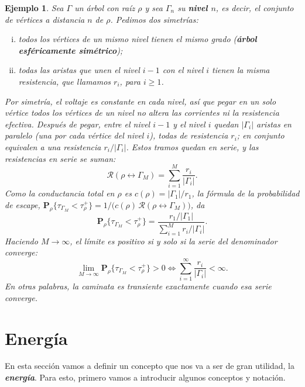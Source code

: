 \documentclass[11pt,a4paper]{article}
\newcommand{\Prob}{\textbf{P}}
\newcommand{\defn}[1]{\textbf{\emph{#1}}}
\numberwithin{equation}{section}
\theoremstyle{LPplain}
\theoremstyle{LPdef}
\theoremstyle{LPrem}
\newtheorem{ejemplo}[teo]{Ejemplo}
\begin{document}
\begin{ejemplo}\label{ej:arbol-simetrico}
  Sea $\Gamma$ un árbol con raíz $\rho$ y sea $\Gamma_n$ su \defn{nivel $n$},
  es decir, el conjunto de vértices a distancia $n$ de $\rho$. Pedimos dos
  simetrías:
  \begin{enumerate}[(i)]
    \item todos los vértices de un mismo nivel tienen el mismo grado
          (\defn{árbol esféricamente simétrico});
    \item todas las aristas que unen el nivel $i-1$ con el nivel $i$ tienen la
          misma resistencia, que llamamos $r_i$, para $i \ge 1$.
  \end{enumerate}
  Por simetría, el voltaje es constante en cada nivel, así que pegar en un solo
  vértice todos los vértices de un nivel no altera las corrientes ni la
  resistencia efectiva. Después de pegar, entre el nivel $i-1$ y el nivel $i$
  quedan $\lvert\Gamma_i\rvert$ aristas en paralelo (una por cada vértice del
  nivel $i$), todas de resistencia $r_i$; en conjunto equivalen a una
  resistencia $r_i/\lvert\Gamma_i\rvert$. Estos tramos quedan en serie, y las
  resistencias en serie se suman:
  \begin{equation}\label{eq:reff-arbol}
    \mathscr{R}(\rho \leftrightarrow \Gamma_M)
      = \sum_{i=1}^{M} \frac{r_i}{\lvert\Gamma_i\rvert}.
  \end{equation}
  Como la conductancia total en $\rho$ es $c(\rho) = \lvert\Gamma_1\rvert / r_1$,
  la fórmula de la probabilidad de escape, $\Prob_\rho\{\tau_{\Gamma_M} < \tau_\rho^+\}
  = 1/\bigl(c(\rho)\,\mathscr{R}(\rho \leftrightarrow \Gamma_M)\bigr)$, da
  \begin{equation}\label{eq:escape-arbol}
    \Prob_\rho\{\tau_{\Gamma_M} < \tau_\rho^+\}
      = \frac{r_1/\lvert\Gamma_1\rvert}{\displaystyle\sum_{i=1}^{M} r_i/\lvert\Gamma_i\rvert}.
  \end{equation}
  Haciendo $M \to \infty$, el límite es positivo si y solo si la serie del
  denominador converge:
  \[
    \lim_{M\to\infty} \Prob_\rho\{\tau_{\Gamma_M} < \tau_\rho^+\} > 0
    \iff \sum_{i=1}^{\infty} \frac{r_i}{\lvert\Gamma_i\rvert} < \infty.
  \]
  En otras palabras, la caminata es transiente exactamente cuando esa serie
  converge.
\end{ejemplo}

\section{Energía}
  En esta sección vamos a definir un concepto que nos va a ser de 
  gran utilidad, la \defn{energía}. Para esto, primero vamos a introducir algunos conceptos
  y notación.
\end{document}
